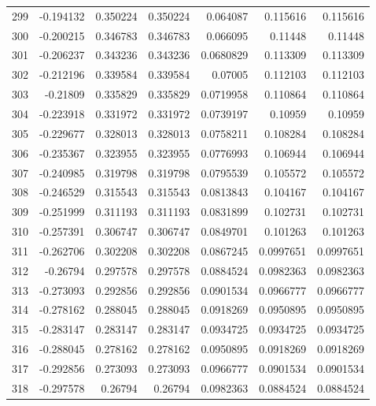 \begin{tabular}{rrrrrrr}
 299 & -0.194132    & 0.350224    & 0.350224    &  0.064087    & 0.115616    & 0.115616    \\
 300 & -0.200215    & 0.346783    & 0.346783    &  0.066095    & 0.11448     & 0.11448     \\
 301 & -0.206237    & 0.343236    & 0.343236    &  0.0680829   & 0.113309    & 0.113309    \\
 302 & -0.212196    & 0.339584    & 0.339584    &  0.07005     & 0.112103    & 0.112103    \\
 303 & -0.21809     & 0.335829    & 0.335829    &  0.0719958   & 0.110864    & 0.110864    \\
 304 & -0.223918    & 0.331972    & 0.331972    &  0.0739197   & 0.10959     & 0.10959     \\
 305 & -0.229677    & 0.328013    & 0.328013    &  0.0758211   & 0.108284    & 0.108284    \\
 306 & -0.235367    & 0.323955    & 0.323955    &  0.0776993   & 0.106944    & 0.106944    \\
 307 & -0.240985    & 0.319798    & 0.319798    &  0.0795539   & 0.105572    & 0.105572    \\
 308 & -0.246529    & 0.315543    & 0.315543    &  0.0813843   & 0.104167    & 0.104167    \\
 309 & -0.251999    & 0.311193    & 0.311193    &  0.0831899   & 0.102731    & 0.102731    \\
 310 & -0.257391    & 0.306747    & 0.306747    &  0.0849701   & 0.101263    & 0.101263    \\
 311 & -0.262706    & 0.302208    & 0.302208    &  0.0867245   & 0.0997651   & 0.0997651   \\
 312 & -0.26794     & 0.297578    & 0.297578    &  0.0884524   & 0.0982363   & 0.0982363   \\
 313 & -0.273093    & 0.292856    & 0.292856    &  0.0901534   & 0.0966777   & 0.0966777   \\
 314 & -0.278162    & 0.288045    & 0.288045    &  0.0918269   & 0.0950895   & 0.0950895   \\
 315 & -0.283147    & 0.283147    & 0.283147    &  0.0934725   & 0.0934725   & 0.0934725   \\
 316 & -0.288045    & 0.278162    & 0.278162    &  0.0950895   & 0.0918269   & 0.0918269   \\
 317 & -0.292856    & 0.273093    & 0.273093    &  0.0966777   & 0.0901534   & 0.0901534   \\
 318 & -0.297578    & 0.26794     & 0.26794     &  0.0982363   & 0.0884524   & 0.0884524   \\

\end{tabular}
